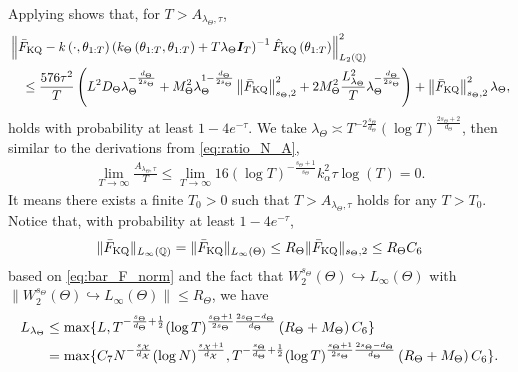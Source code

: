 Applying  shows that, for $T > A_{\lambda_\Theta, \tau}$, 
\begin{align}\label{eq:stage_ii_1}
     & \left\|\bar{F}_{\text{KQ}}-k\left(\cdot, \theta_{1: T}\right)\left(k_{\Theta}\left(\theta_{1: T}, \theta_{1: T}\right) + T \lambda_{\Theta} \boldsymbol{I}_T\right)^{-1} \hat{F}_{\text{KQ}}\left(\theta_{1: T}\right)\right\|_{L_2(\mathbb{Q})}^2 \nonumber \\
     &\quad \leq \frac{576 \tau^2}{T} \left( L^2 D_\Theta \lambda_\Theta^{ -\frac{d_\Theta}{2s_\Theta} } + M_\Theta^2 \lambda_\Theta^{1 - \frac{d_\Theta}{2s_\Theta}} \left\| \bar{F}_{\text{KQ}} \right \|_{s_\Theta, 2}^2  + 2 M_\Theta^2 \frac{L_{\lambda_\Theta}^2}{T} \lambda_\Theta^{-\frac{d_\Theta}{2s_\Theta}} \right) + \left\| \bar{F}_{\text{KQ}} \right\|_{s_\Theta, 2}^2 \lambda_\Theta ,
\end{align}
holds with probability at least $1 - 4 e^{-\tau}$.
We take $\lambda_\Theta \asymp T^{-2 \frac{s_\Theta}{d_\Theta}} (\log T)^{\frac{2s_\Theta+2}{d_\Theta}}$, then similar to the derivations from \eqref{eq:ratio_N_A},
\begin{align}\label{eq:T_large_enough}
    \lim_{T \to \infty} \frac{A_{\lambda_\Theta, \tau}}{T} \leq \lim_{T \to \infty} 16 (\log T)^{- \frac{s_\Theta+1}{s_\Theta}} k_{\alpha}^2 \tau \log \left( T\right) = 0 .
\end{align}
It means there exists a finite $T_0 > 0$ such that $T > A_{\lambda_\Theta, \tau}$ holds for any $T > T_0$. Notice that, with probability at least $1-4e^{-\tau}$,
\begin{align}\label{eq:C6_use}
    \| \bar{F}_{\text{KQ}} \|_{L_\infty(\mathbb{Q})} = \| \bar{F}_{\text{KQ}} \|_{L_\infty(\Theta)} \leq R_\Theta \| \bar{F}_{\text{KQ}} \|_{s_\Theta, 2} \leq R_\Theta C_6
\end{align} 
based on \eqref{eq:bar_F_norm} and the fact that $W_2^{s_\Theta}(\Theta) \hookrightarrow L_\infty(\Theta)$ with $\|W_2^{s_\Theta}(\Theta) \hookrightarrow L_\infty(\Theta)\| \leq R_\Theta$, we have
\begin{align*}
    L_{\lambda_\Theta} &\leq \max \{ L, T^{-\frac{s_\Theta}{d_\Theta} + \frac{1}{2}} (\log T)^{\frac{s_\Theta+1}{2s_\Theta} \frac{2s_\Theta-d_\Theta}{d_\Theta}} \left( R_\Theta + M_\Theta \right) C_6  \} \\
    &= \max \{ C_7 N^{-\frac{s_{\mathcal{X}}}{d_{\mathcal{X}}}} (\log N)^{\frac{s_{\mathcal{X}}+1}{d_{\mathcal{X}}}}, T^{-\frac{s_\Theta}{d_\Theta} + \frac{1}{2}} (\log T)^{\frac{s_\Theta+1}{2s_\Theta} \frac{2s_\Theta-d_\Theta}{d_\Theta}} \left( R_\Theta + M_\Theta \right) C_6 \}.
\end{align*}
